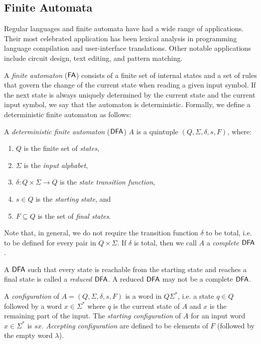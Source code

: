\subsection{Finite Automata}
\label{subsection:finite-automata}

Regular languages and finite automata have had a wide range of applications. Their most celebrated application has been lexical analysis in programming language compilation and user-interface translations. Other notable applications include circuit design, text editing, and pattern matching.

A \emph{finite automaton} \index{$\FA$}($\FA$) consists of a finite set of internal states and a set of rules that govern the change of the current state when reading a given input symbol. If the next state is always uniquely determined by the current state and the current input symbol, we say that the automaton is deterministic. Formally, we define a deterministic finite automaton as follows:

A \emph{deterministic finite automaton} \index{$\DFA$}($\DFA$) $A$ is a quintuple $(Q, \Sigma, \delta, s, F)$, where:

\begin{enumerate}[]
\item $Q$ is the finite set of \emph{states},
\item $\Sigma$ is the \emph{input alphabet},
\item $\delta: Q \times \Sigma \to Q$ is the \emph{state transition function},
\item $s \in Q$ is the \emph{starting state}, and
\item $F \subseteq Q$ is the set of \emph{final states}.
\end{enumerate}

Note that, in general, we do not require the transition function $\delta$ to be total, i.e. to be defined for every pair in $Q \times \Sigma$. If $\delta$ is total, then we call $A$ a \emph{complete} $\DFA$.

A \index{$\DFA$}$\DFA$ such that every state is reachable from the starting state and reaches a final state is called a \emph{reduced} $\DFA$. A reduced $\DFA$ may not be a complete $\DFA$.

A \emph{configuration} of $A = (Q, \Sigma, \delta, s, F)$ is a word in $Q \Sigma^*$, i.e. a state $q \in Q$ followed by a word $x \in \Sigma^*$ where $q$ is the current state of $A$ and $x$ is the remaining part of the input. The \emph{starting configuration} of $A$ for an input word $x \in \Sigma^*$ is $sx$.  \emph{Accepting configuration} are defined to be elements of $F$ (followed by the empty word $\lambda$).

